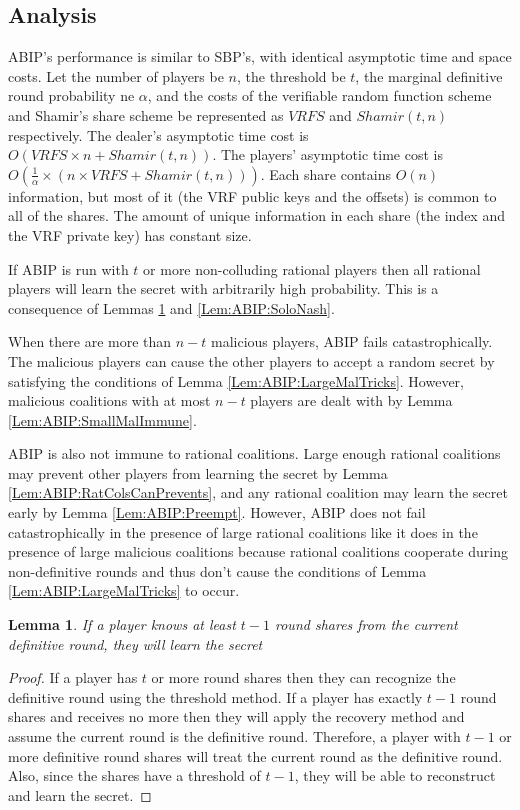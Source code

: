 \documentclass{dalcsthesis}
\newtheorem{lemma}{Lemma}
\begin{document}
\subsection{Analysis}

ABIP's performance is similar to SBP's, with identical asymptotic time and space costs. Let the number of players be $n$, the threshold be $t$, the marginal definitive round probability ne $\alpha$, and the costs of the verifiable random function scheme and Shamir's share scheme be represented as $VRFS$ and $Shamir(t, n)$ respectively. The dealer's asymptotic time cost is $O(VRFS \times n + Shamir(t, n))$. The players' asymptotic time cost is $O(\frac{1}{\alpha} \times (n \times VRFS + Shamir(t, n)))$. Each share contains $O(n)$ information, but most of it (the VRF public keys and the offsets) is common to all of the shares. The amount of unique information in each share (the index and the VRF private key) has constant size.

If ABIP is run with $t$ or more non-colluding rational players then all rational players will learn the secret with arbitrarily high probability. This is a consequence of Lemmas \ref{Lem:ABIP:t-1Def_Sufficient} and \ref{Lem:ABIP:SoloNash}.  

When there are more than $n-t$ malicious players, ABIP fails catastrophically. The malicious players can cause the other players to accept a random secret by satisfying the conditions of Lemma \ref{Lem:ABIP:LargeMalTricks}. However, malicious coalitions with at most $n-t$ players are dealt with by Lemma \ref{Lem:ABIP:SmallMalImmune}.

ABIP is also not immune to rational coalitions. Large enough rational coalitions may prevent other players from learning the secret by Lemma \ref{Lem:ABIP:RatColsCanPrevents}, and any rational coalition may learn the secret early by Lemma \ref{Lem:ABIP:Preempt}. However, ABIP does not fail catastrophically in the presence of large rational coalitions like it does in the presence of large malicious coalitions because rational coalitions cooperate during non-definitive rounds and thus don't cause the conditions of Lemma \ref{Lem:ABIP:LargeMalTricks} to occur. 

\begin{lemma} If a player knows at least $t-1$ round shares from the current definitive round, they will learn the secret \label{Lem:ABIP:t-1Def_Sufficient} \end{lemma}
\begin{proof}
If a player has $t$ or more round shares then they can recognize the definitive round using the threshold method. If a player has exactly $t-1$ round shares and receives no more then they will apply the recovery method and assume the current round is the definitive round. Therefore, a player with $t-1$ or more definitive round shares will treat the current round as the definitive round. Also, since the shares have a threshold of $t-1$, they will be able to reconstruct and learn the secret.
\end{proof}
\end{document}
